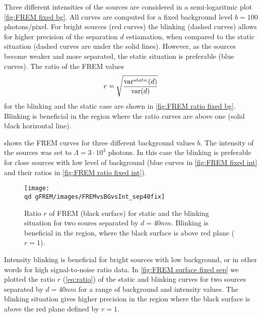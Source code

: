 Three different intensities of the sources are considered in a semi-logaritmic plot \autoref{fig:FREM fixed bg}. All curves are computed for a fixed background level $b=100$ photons/pixel. For bright sources (red curves) the blinking (dashed curves) allows for higher precision of the separation $d$ estiamation, when compared to the static situation (dashed curves are under the solid lines). However, as the sources become weaker and more separated, the static situation is preferable (blue curves). The ratio of the FREM values
%
\begin{equation}
	r=\sqrt{\frac{\mathrm{var}^{static}(d)}{\mathrm{var}(d)}}
	\label{eq:ratio}
\end{equation} 
%
for the blinking and the static case are shown in \autoref{fig:FREM ratio fixed bg}. Blinking is beneficial in the region where the ratio curves are above one (solid black horizontal line).

 shows the FREM curves for three different background values $b$. The intensity of the sources was set to $\Lambda =3\cdot 10^3$ photons. In this case the blinking is preferable for close sources with low level of background (blue curves in \autoref{fig:FREM fixed int} and their ratios in  \autoref{fig:FREM ratio fixed int}). 

\begin{figure}[!hbt]
	\centering
	\newcommand{\wf}{.8\textwidth}
	\texttt{[image: \\qd gFREM/images/FREMvsBGvsInt\_sep40fix]}
	\caption{Ratio $r$ of FREM (black surface) for static and the blinking situation for two soures separated by $d=40\unit{nm}$. Blinking is beneficial in the region, where the black surface is above red plane ($r=1$).}
	\label{fig:FREM surface fixed sep}
\end{figure}
%
Intensity blinking is beneficial for bright sources with low background, or in other words for high signal-to-noise ratio data. In \autoref{fig:FREM surface fixed sep} we plotted the ratio $r$ (\autoref{eq:ratio}) of the static and blinking curves for two sources separated by $d=40\unit{nm}$ for a range of background and intensity values. The blinking situation gives higher precision in the region where the black surface is above the red plane defined by $r=1$. 


